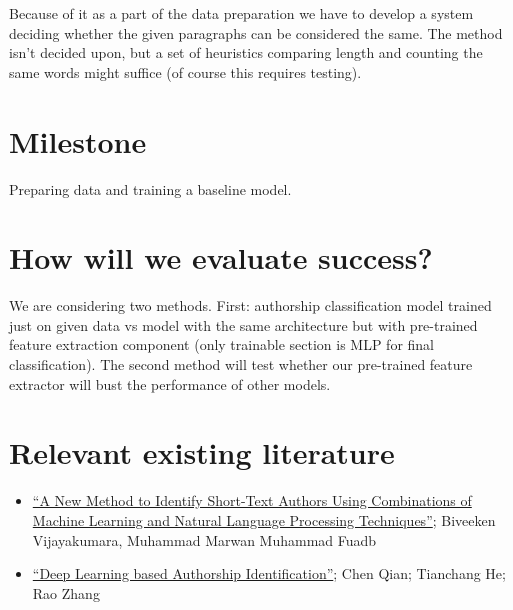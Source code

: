\documentclass{article}
\begin{document}
Because of it as a part of the data preparation we have to develop a system deciding whether the given paragraphs can be considered the same. The method isn't decided upon, but a set of heuristics comparing length and counting the same words might suffice (of course this requires testing).

\section{Milestone}
Preparing data and training a baseline model.

\section{How will we evaluate success?}
We are considering two methods. First: authorship classification model trained just on given data vs model with the same architecture but with pre-trained feature extraction component (only trainable section is MLP for final classification). The second method will test whether our pre-trained feature extractor will bust the performance of other models.

\section{Relevant existing literature}
\begin{itemize}
    \item \href{https://reader.elsevier.com/reader/sd/pii/S1877050919313791?token=E79C223624500BFB669FF9BACC0506AA22D90F8B15E80D1602653D05322F0E82EFDEB89C5B0597F23413FAE3A29961F2&originRegion=eu-west-1&originCreation=20220524183711}{``A New Method to Identify Short-Text Authors Using Combinations of Machine Learning and Natural Language Processing Techniques''}; Biveeken Vijayakumara, Muhammad Marwan Muhammad Fuadb
    \item \href{https://web.stanford.edu/class/archive/cs/cs224n/cs224n.1174/reports/2760185.pdf}{``Deep Learning based Authorship Identification''}; Chen Qian; Tianchang He; Rao Zhang
\end{itemize}
\end{document}
